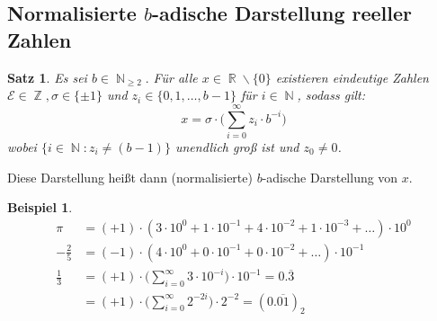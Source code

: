 \documentclass[a4paper,12pt]{article}
\DeclareMathOperator{\N}{\mathbb N}
\DeclareMathOperator{\R}{\mathbb R}
\DeclareMathOperator{\Z}{\mathbb Z}
\newtheorem{satz}[axiom]{Satz}
\theoremstyle{definition}
\newtheorem*{example}{Beispiel}
\begin{document}
	\subsection{Normalisierte $b$-adische Darstellung reeller Zahlen}
	\begin{satz}
		Es sei $b \in \N_{\geq 2}.$ Für alle $x \in \R \backslash\{0\}$ existieren eindeutige Zahlen $\mathcal{E} \in \Z, \sigma \in \{\pm 1\}$ und $z_i \in \{0,1,\ldots, b-1\}$ für $i \in \N$, sodass gilt:
		\[
			x = \sigma \cdot \Big(\sum_{i = 0}^{\infty}z_i \cdot b^{-i}\Big)
		\]
		wobei $\{i \in \N: z_i \neq (b-1)\}$ unendlich groß ist und $z_0 \neq 0$.
	\end{satz}
	Diese Darstellung heißt dann (normalisierte) $b$-adische Darstellung von $x$.
	\begin{example}
		\begin{align*}
			\pi &= (+1) \cdot (3\cdot 10^0 + 1\cdot 10^{-1} + 4 \cdot 10^{-2} + 1 \cdot 10^{-3} + \dots) \cdot 10^0\\
			-\frac{2}{5} &= (-1) \cdot (4 \cdot 10^0 + 0 \cdot 10^{-1} + 0 \cdot 10^{-2} + \dots) \cdot 10^{-1}\\
			\frac{1}{3} &= (+1) \cdot \Big(\sum_{i = 0}^{\infty}3 \cdot 10^{-i}\Big) \cdot 10^{-1} = 0.\overline{3}\\
			&= (+1) \cdot \Big(\sum_{i = 0}^{\infty}2^{-2i}\Big) \cdot 2^{-2} = (0.\overline{01})_2
		\end{align*}
	\end{example}
\end{document}
